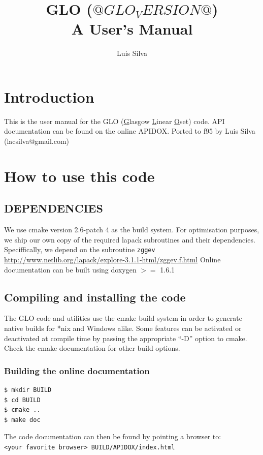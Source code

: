 \documentclass[a4paper,10pt]{book}
\title{GLO ($@GLO_VERSION@$) \\ A User's Manual}
\author{Luis Silva}
\begin{document}

\maketitle

\clearpage{}

\tableofcontents

\clearpage{}
\chapter*{Introduction}
This is the user manual for the GLO (\underline{G}lasgow \underline{L}inear \underline{O}set) code.
API documentation can be found on the online APIDOX.
Ported to f95 by Luis Silva (lacsilva@gmail.com)

\chapter{How to use this code}

\section{DEPENDENCIES}
We use cmake version 2.6-patch 4 as the build system.
For optimisation purposes, we ship our own copy of the required lapack
subroutines and their dependencies. Speciffically, we depend on the subroutine
\verb|zggev| \url{http://www.netlib.org/lapack/explore-3.1.1-html/zggev.f.html}
Online documentation can be built using doxygen $>=$ 1.6.1

\section{Compiling and installing the code}
The GLO code and utilities use the cmake build system in order to generate
native builds for *nix and Windows alike. Some features can be activated or
deactivated at compile time by passing the appropriate ``-D'' option to cmake.
Check the cmake documentation \citep{CMakeDox} for other build options.

\subsection{Building the online documentation}
\begin{verbatim}
$ mkdir BUILD
$ cd BUILD
$ cmake ..
$ make doc
\end{verbatim}
The code documentation can then be found by pointing a browser
to:\\
\verb|<your favorite browser> BUILD/APIDOX/index.html|
\end{document}

